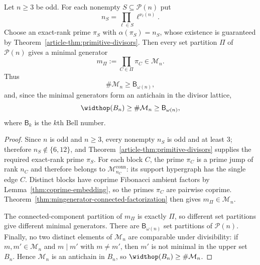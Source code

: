 \begin{corollary}\label{cor:odd-primitive-cover-realization}
Let $n\ge3$ be odd. For each nonempty $S\subseteq\mathcal P(n)$ put
\[
n_S=\prod_{\ell\in S}\ell^{\nu_\ell(n)}.
\]
Choose an exact-rank prime $\pi_S$ with $\alpha(\pi_S)=n_S$, whose existence is
guaranteed by Theorem~\ref{article-thm:primitive-divisors}. Then every set partition
$\Pi$ of $\mathcal P(n)$ gives a minimal generator
\[
m_\Pi:=\prod_{C\in\Pi}\pi_C\in\mathcal M_n.
\]
Thus
\[
\#\mathcal M_n\ge \mathsf B_{\omega(n)},
\]
and, since the minimal generators form an antichain in the divisor lattice,
\[
\widthop(B_n)\ge \#\mathcal M_n\ge \mathsf B_{\omega(n)},
\]
where $\mathsf B_k$ is the $k$th Bell number.
\end{corollary}

\begin{proof}
Since $n$ is odd and $n\ge3$, every nonempty $n_S$ is odd and at least $3$;
therefore $n_S\notin\{6,12\}$, and Theorem~\ref{article-thm:primitive-divisors}
supplies the required exact-rank prime $\pi_S$. For each block $C$, the prime
$\pi_C$ is a prime jump of rank $n_C$ and
therefore belongs to $\mathcal M_{n_C}^{\mathrm{conn}}$: its support
hypergraph has the single edge $C$. Distinct blocks have coprime Fibonacci
ambient factors by Lemma~\ref{thm:coprime-embedding}, so the primes
$\pi_C$ are pairwise coprime. Theorem~\ref{thm:mingenerator-connected-factorization}
then gives $m_\Pi\in\mathcal M_n$.

The connected-component partition of $m_\Pi$ is exactly $\Pi$, so different
set partitions give different minimal generators. There are
$\mathsf B_{\omega(n)}$ set partitions of $\mathcal P(n)$.
Finally, no two distinct elements of $\mathcal M_n$ are comparable under
divisibility: if $m,m'\in\mathcal M_n$ and $m\mid m'$ with $m\ne m'$, then
$m'$ is not minimal in the upper set $B_n$. Hence $\mathcal M_n$ is an
antichain in $B_n$, so $\widthop(B_n)\ge\#\mathcal M_n$.
\end{proof}


